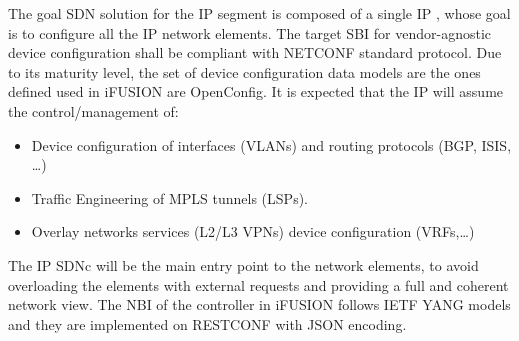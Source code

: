 \documentclass[10pt, conference]{IEEEtran}
\begin{document}
The goal SDN solution for the IP segment is composed of a single IP , whose goal is to configure all the IP network elements. The target SBI for vendor-agnostic device configuration shall be compliant with NETCONF standard protocol.  Due to its maturity level, the set of device configuration data models are the ones defined used in i\uppercase{FUSION} are OpenConfig.
It is expected that the IP  will assume the control/management of:
\begin{itemize}
\item Device configuration of interfaces (VLANs) and routing protocols (BGP, ISIS, …)
\item Traffic Engineering of MPLS tunnels (LSPs). 
\item Overlay networks services (L2/L3 VPNs) device configuration (VRFs,\dots)
\end{itemize}

The IP SDNc will be the main entry point to the network elements, to avoid overloading the elements with external requests and providing a  full and coherent network view. The NBI of the controller in i\uppercase{FUSION} follows IETF YANG models and they are implemented on RESTCONF with JSON encoding. 

\end{document}
